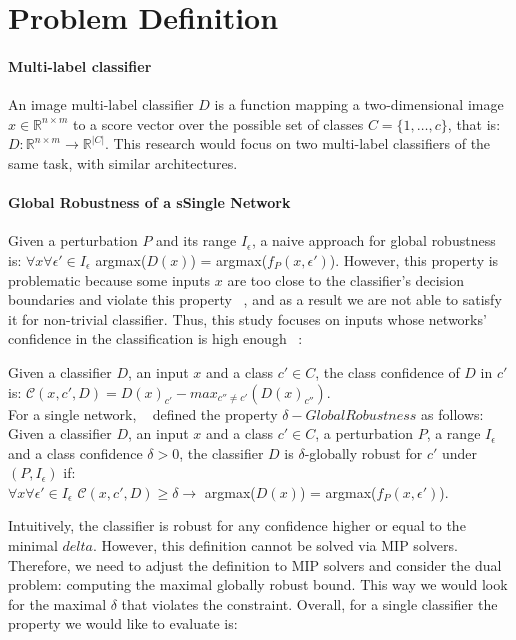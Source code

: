 
\section{Problem Definition}

\sloppy
\paragraph{Multi-label classifier}
An image multi-label classifier $D$ is a function mapping a two-dimensional image $x\in \mathbb{R}^{n \times m}$ to a score vector over the possible set of classes $C=\{1,\ldots,c\}$, that is:
$D: \mathbb{R}^{n \times m} \rightarrow {\mathbb{R}}^{|C|}$.
This research would focus on two multi-label classifiers of the same task, with similar architectures.


\paragraph{Global Robustness of a sSingle Network}
Given a perturbation $P$ and its range $I_\epsilon$, a naive approach for global robustness is:
$\forall{x}\forall{\epsilon'}\in{I_\epsilon}$  argmax($D(x)$) = argmax($f_P(x,\epsilon')$).
However, this property is problematic because some inputs $x$ are too close to the classifier's decision boundaries and violate this property ~\cite{DECISIONBOUND}, and as a result we are not able to satisfy it for non-trivial classifier. Thus, this study focuses on inputs whose networks' confidence in the classification is high enough ~\cite{VHAGAR}:

Given a classifier $D$, an input $x$ and a class $c'\in{C}$, the class confidence of $D$ in $c'$ is:
$\mathcal{C}(x,c',D)=D(x)_{c'}-max_{c''\ne c'}(D(x)_{c''})$.\\
For a single network, ~\cite{VHAGAR} defined the property $\delta-Global Robustness$ as follows:\\
Given a classifier $D$, an input $x$ and a class $c'\in{C}$, a perturbation $P$, a range $I_\epsilon$ and a class confidence $\delta>0$, the classifier $D$ is $\delta$-globally robust for $c'$ under $(P,I_\epsilon)$ if:\\
$\forall{x}\forall{\epsilon'}\in{I_\epsilon}$ $\mathcal{C}(x,c',D) \geq \delta \rightarrow$ argmax($D(x)$) = argmax($f_P(x,\epsilon')$).

Intuitively, the classifier is robust for any confidence higher or equal to the minimal $delta$. However, this definition cannot be solved via MIP solvers. Therefore, we need to adjust the definition to MIP solvers and consider the dual problem: computing the maximal globally robust bound. This way we would look for the maximal $\delta$ that violates the constraint. Overall, for a single classifier the property we would like to evaluate is:

